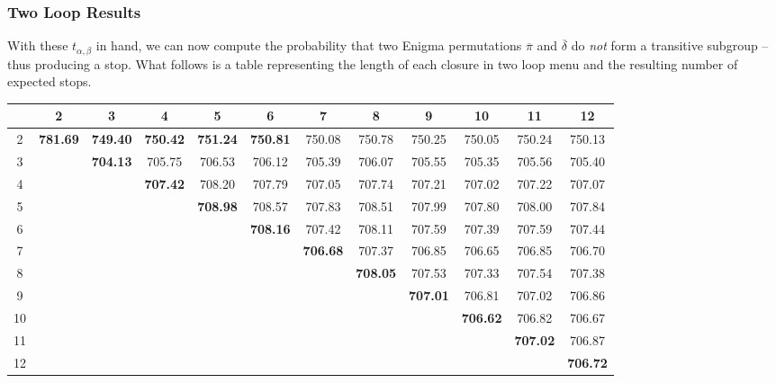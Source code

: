 \subsubsection{Two Loop Results}
With these $t_{\alpha, \beta}$ in hand, we can now compute the
probability that two Enigma permutations $\overline\pi$ and
$\overline\delta$ do \emph{not} form a transitive subgroup -- thus
producing a stop. What follows is a table representing the length of
each closure in two loop menu and the resulting number of expected stops.
\begin{table}[H]
  \centering
  \begin{adjustbox}{max width=\textwidth,max height=2\textheight}
\begin{tabular}{|c|c|c|c|c|c|c|c|c|c|c|c|}
  \hline
  & 2       & 3       & 4       & 5       & 6       & 7       & 8       & 9       & 10      & 11      & 12      \\
  \hline
  2 & \textbf{781.69} & \textbf{749.40} & \textbf{750.42} & \textbf{751.24} & \textbf{750.81} & 750.08 & 750.78 & 750.25 & 750.05 & 750.24 & 750.13 \\
  \hline
  3 &               & \textbf{704.13} & 705.75 & 706.53 & 706.12 & 705.39 & 706.07 & 705.55 & 705.35 & 705.56 & 705.40 \\
  \hline
  4 &               &               & \textbf{707.42} & 708.20 & 707.79 & 707.05 & 707.74 & 707.21 & 707.02 & 707.22 & 707.07 \\
  \hline
  5 &               &               &               & \textbf{708.98} & 708.57 & 707.83 & 708.51 & 707.99 & 707.80 & 708.00 & 707.84 \\
  \hline
  6 &               &               &               &               & \textbf{708.16} & 707.42 & 708.11 & 707.59 & 707.39 & 707.59 & 707.44 \\
  \hline
  7 &               &               &               &               &               & \textbf{706.68} & 707.37 & 706.85 & 706.65 & 706.85 & 706.70 \\
  \hline
  8 &               &               &               &               &               &               & \textbf{708.05} & 707.53 & 707.33 & 707.54 & 707.38 \\
  \hline
  9 &               &               &               &               &               &               &               & \textbf{707.01} & 706.81 & 707.02 & 706.86 \\
  \hline
  10 &              &               &               &               &               &               &               &               & \textbf{706.62} & 706.82 & 706.67 \\
  \hline
  11 &              &               &               &               &               &               &               &               &               & \textbf{707.02} & 706.87 \\
  \hline
  12 &              &               &               &               &               &               &               &               &               &               & \textbf{706.72} \\
  \hline
\end{tabular}


\end{adjustbox}
\end{table}
